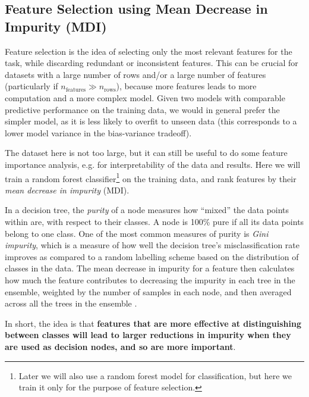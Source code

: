 \subsection{Feature Selection using Mean Decrease in Impurity (MDI)}

Feature selection is the idea of selecting only the most relevant features for the task, while discarding redundant or inconsistent features. This can be crucial for datasets with a large number of rows and/or a large number of features (particularly if $n_{\text{features}} \gg n_{\text{rows}}$), because more features leads to more computation and a more complex model. Given two models with comparable predictive performance on the training data, we would in general prefer the simpler model, as it is less likely to overfit to unseen data (this corresponds to a lower model variance in the bias-variance tradeoff).

The dataset here is not too large, but it can still be useful to do some feature importance analysis, e.g. for interpretability of the data and results. Here we will train a random forest classifier\footnote{Later we will also use a random forest model for classification, but here we train it only for the purpose of feature selection.} on the training data, and rank features by their \textit{mean decrease in impurity} (MDI).

In a decision tree, the \textit{purity} of a node measures how ``mixed'' the data points within are, with respect to their classes. A node is 100\% pure if all its data points belong to one class. One of the most common measures of purity is \textit{Gini impurity}, which is a measure of how well the decision tree's misclassification rate improves as compared to a random labelling scheme based on the distribution of classes in the data. The mean decrease in impurity for a feature then calculates how much the feature contributes to decreasing the impurity in each tree in the ensemble, weighted by the number of samples in each node, and then averaged across all the trees in the ensemble \parencite{mdi}.

In short, the idea is that \textbf{features that are more effective at distinguishing between classes will lead to larger reductions in impurity when they are used as decision nodes, and so are more important}. 

